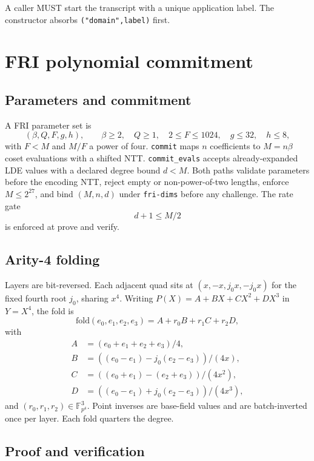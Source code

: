\documentclass[11pt,a4paper]{article}
\newcommand{\yFpFour}{\mathbb{F}_{p^4}}
\newcommand{\yFold}{\mathrm{fold}}
\begin{document}
A caller MUST start the transcript with a unique application label. The
constructor absorbs \texttt{("domain",label)} first.

\section{FRI polynomial commitment}

\subsection{Parameters and commitment}

A FRI parameter set is
\[
(\beta,Q,F,g,h),\qquad
\beta\ge2,\quad Q\ge1,\quad 2\le F\le1024,\quad g\le32,\quad h\le8,
\]
with $F<M$ and $M/F$ a power of four. \texttt{commit} maps $n$ coefficients
to $M=n\beta$ coset evaluations with a shifted NTT. \texttt{commit\_evals}
accepts already-expanded LDE values with a declared degree bound $d<M$. Both
paths validate parameters before the encoding NTT, reject empty or
non-power-of-two lengths, enforce $M\le2^{27}$, and bind $(M,n,d)$ under
\texttt{fri-dims} before any challenge. The rate gate
\[
d+1\le M/2
\]
is enforced at prove and verify.

\subsection{Arity-4 folding}

Layers are bit-reversed. Each adjacent quad sits at
$(x,-x,j_0x,-j_0x)$ for the fixed fourth root $j_0$, sharing $x^4$. Writing
$P(X)=A+BX+CX^2+DX^3$ in $Y=X^4$, the fold is
\[
\yFold(e_0,e_1,e_2,e_3)=A+r_0B+r_1C+r_2D,
\]
with
\[
\begin{aligned}
A&=(e_0+e_1+e_2+e_3)/4,\\
B&=((e_0-e_1)-j_0(e_2-e_3))/(4x),\\
C&=((e_0+e_1)-(e_2+e_3))/(4x^2),\\
D&=((e_0-e_1)+j_0(e_2-e_3))/(4x^3),
\end{aligned}
\]
and $(r_0,r_1,r_2)\in\yFpFour^3$. Point inverses are base-field values and
are batch-inverted once per layer. Each fold quarters the degree.

\subsection{Proof and verification}
\end{document}
